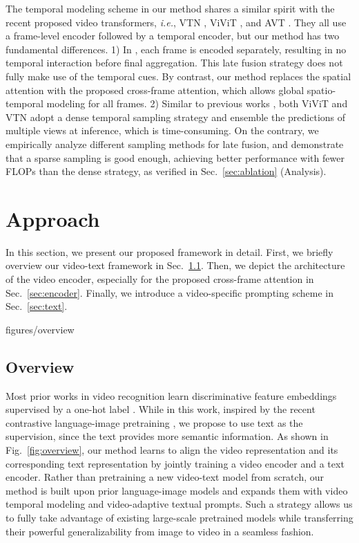 \documentclass[runningheads]{llncs}
\begin{document}
The temporal modeling scheme in our method shares a similar spirit with the recent proposed video transformers, \emph{i.e.}, VTN \cite{neimark2021VTN}, ViViT \cite{arnab2021vivit}, and AVT \cite{avt}. They all use a frame-level encoder followed by a temporal encoder, but our method has two fundamental differences. 1) In  \cite{neimark2021VTN,arnab2021vivit,avt}, each frame is encoded separately, resulting in no temporal interaction before final aggregation. This late fusion strategy does not fully make use of the temporal cues. By contrast, our method replaces the spatial attention with the proposed cross-frame attention, which allows global spatio-temporal modeling for all frames. 2) Similar to previous works \cite{liu2021video,Fan_2021_ICCV,feichtenhofer2019slowfast,timesformer2021}, both ViViT \cite{arnab2021vivit} and VTN \cite{neimark2021VTN} adopt a dense temporal sampling strategy and ensemble the predictions of multiple views at inference, which is time-consuming. On the contrary, we empirically analyze different sampling methods for late fusion, and demonstrate that a sparse sampling is good enough, achieving better performance with fewer FLOPs than the dense strategy, as verified in Sec.~\ref{sec:ablation} (Analysis). 

\section{Approach}
In this section, we present our proposed framework in detail. First, we briefly overview our video-text framework in Sec.~\ref{sec:overview}. Then, we depict the architecture of the video encoder, especially for the proposed cross-frame attention in Sec.~\ref{sec:encoder}. Finally, we introduce a video-specific prompting scheme in Sec.~\ref{sec:text}.

{figures/overview}

\subsection{Overview}\label{sec:overview}


Most prior works in video recognition learn discriminative feature embeddings supervised by a one-hot label \cite{arnab2021vivit,timesformer2021,feichtenhofer2019slowfast,wang2016tsn}. While in this work, inspired by the recent contrastive language-image pretraining \cite{clip,align,florence}, we propose to use text as the supervision, since the text provides more semantic information. As shown in Fig.~\ref{fig:overview}, our method learns to align the video representation and its corresponding text representation by jointly training a video encoder and a text encoder. Rather than pretraining a new video-text model from scratch, our method is built upon prior language-image models and expands them with video temporal modeling and video-adaptive textual prompts. Such a strategy allows us to fully take advantage of existing large-scale  pretrained models while transferring their powerful generalizability from image to video in a seamless fashion. 
\end{document}
